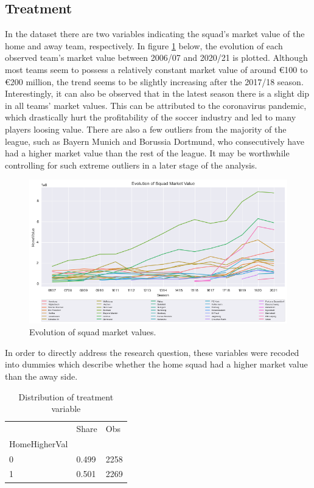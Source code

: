 \documentclass[11pt]{article}
\begin{document}
\subsection{Treatment}

In the dataset there are two variables indicating the squad's market value of the home and away team, respectively. In figure \ref{fig:TimeSeries} below, the evolution of each observed team's market value between 2006/07 and 2020/21 is plotted. Although most teams seem to possess a relatively constant market value of around \euro{}100 to \euro{}200 million, the trend seems to be slightly increasing after the 2017/18 season. Interestingly, it can also be observed that in the latest season there is a slight dip in all teams' market values. This can be attributed to the coronavirus pandemic, which drastically hurt the profitability of the soccer industry and led to many players loosing value. There are also a few outliers from the majority of the league, such as Bayern Munich and Borussia Dortmund, who consecutively have had a higher market value than the rest of the league. It may be worthwhile controlling for such extreme outliers in a later stage of the analysis.

\begin{figure}[ht]
	\centering
	\includegraphics[width=1\textwidth]{MarkVal2.png}
	\caption{Evolution of squad market values.}
	\label{fig:TimeSeries}
\end{figure}

In order to directly address the research question, these variables were recoded into dummies which describe whether the home squad had a higher market value than the away side.

\begin{table}[ht]
\centering
	\begin{tabular}{lll} \toprule {}
	  &     Share &   Obs \\
	HomeHigherVal &           &       \\  \midrule
	0             &  0.499 &  2258 \\
	1             &  0.501 &  2269 \\  \bottomrule
	\end{tabular}
\caption{Distribution of treatment variable}
\label{tab:treatmentDist}
\end{table}
\end{document}
